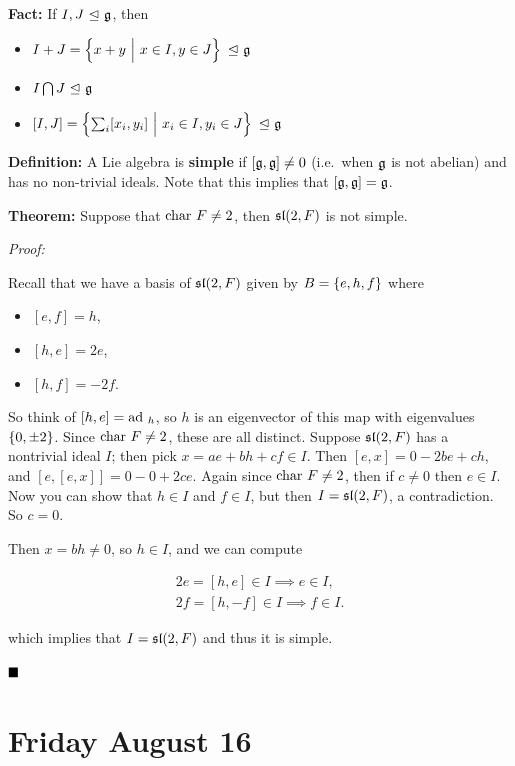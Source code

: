 \textbf{Fact:} If \(I, J {~\trianglelefteq~} {\mathfrak{g}}\), then

\begin{itemize}
\tightlist
\item
  \(I+J = \left\{{x+y{~\mathrel{\Big|}~} x\in I, y\in J}\right\} {~\trianglelefteq~} {\mathfrak{g}}\)
\item
  \(I \bigcap J {~\trianglelefteq~} {\mathfrak{g}}\)
\item
  \([I, J] = \left\{{\sum_i [x_i, y_i] {~\mathrel{\Big|}~} x_i \in I, y_i \in J}\right\} {~\trianglelefteq~} {\mathfrak{g}}\)
\end{itemize}

\textbf{Definition:} A Lie algebra is \textbf{simple} if
\([{\mathfrak{g}}, {\mathfrak{g}}] \neq 0\) (i.e.~when \({\mathfrak{g}}\) is not abelian) and has
no non-trivial ideals. Note that this implies that
\([{\mathfrak{g}}, {\mathfrak{g}}] = {\mathfrak{g}}\).

\textbf{Theorem:} Suppose that \(\mathrm{char}~ F \neq 2\), then \({\mathfrak{sl}}(2, F)\)
is not simple.

\emph{Proof:}

Recall that we have a basis of \({\mathfrak{sl}}(2, F)\) given by
\(B = \left\{{e, h, f}\right\}\) where

\begin{itemize}
\tightlist
\item
  \([e, f] = h\),
\item
  \([h, e] = 2e\),
\item
  \([h, f] = -2f\).
\end{itemize}

So think of \([h, e] = \mathrm{ad}~_h\), so \(h\) is an eigenvector of this map
with eigenvalues \(\left\{{0, \pm 2}\right\}\). Since \(\mathrm{char}~ F \neq 2\), these
are all distinct. Suppose \({\mathfrak{sl}}(2, F)\) has a nontrivial ideal \(I\);
then pick \(x = ae + bh + cf \in I\). Then \([e, x] = 0 - 2be + ch\),
and \([e, [e,x]] = 0 - 0 + 2ce\). Again since \(\mathrm{char}~ F \neq 2\), then if
\(c\neq 0\) then \(e\in I\). Now you can show that \(h\in I\) and
\(f\in I\), but then \(I = {\mathfrak{sl}}(2, F)\), a contradiction. So \(c=0\).

Then \(x = bh \neq 0\), so \(h\in I\), and we can compute

\begin{align*}
2e = [h, e] \in I \implies e \in I, \\
2f = [h, -f] \in I \implies f \in I
.\end{align*}

which implies that \(I = {\mathfrak{sl}}(2, F)\) and thus it is simple.

\(\qed\)

\hypertarget{friday-august-16}{%
\section{Friday August 16}\label{friday-august-16}}

